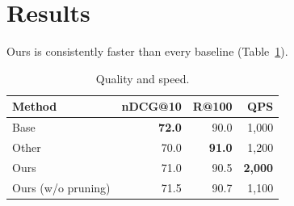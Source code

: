 \documentclass{article}\usepackage{booktabs}
\begin{document}
\section{Results}
Ours is consistently faster than every baseline (Table~\ref{tab:a}).
\begin{table}[h]\centering\caption{Quality and speed.}\label{tab:a}
\begin{tabular}{lrrr}
\toprule
Method & nDCG@10 & R@100 & QPS \\
\midrule
Base & \textbf{72.0} & 90.0 & 1,000 \\
Other & 70.0 & \textbf{91.0} & 1,200 \\
Ours & 71.0 & 90.5 & \textbf{2,000} \\
Ours (w/o pruning) & 71.5 & 90.7 & 1,100 \\
\bottomrule
\end{tabular}\end{table}
\end{document}
